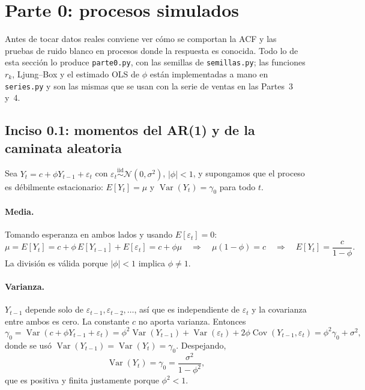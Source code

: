 \section{Parte 0: procesos simulados}
\label{sec:parte0}

Antes de tocar datos reales conviene ver cómo se comportan la ACF y las
pruebas de ruido blanco en procesos donde la respuesta es conocida. Todo lo de
esta sección lo produce \texttt{parte0.py}, con las semillas de
\texttt{semillas.py}; las funciones $r_k$, Ljung--Box y el estimado OLS de
$\phi$ están implementadas a mano en \texttt{series.py} y son las mismas que se
usan con la serie de ventas en las Partes~3 y~4.

\subsection{Inciso 0.1: momentos del AR(1) y de la caminata aleatoria}

Sea $Y_t = c + \phi Y_{t-1} + \varepsilon_t$ con $\varepsilon_t
\overset{\text{iid}}{\sim} \mathcal{N}(0,\sigma^2)$, $|\phi|<1$, y supongamos
que el proceso es débilmente estacionario: $E[Y_t]=\mu$ y
$\operatorname{Var}(Y_t)=\gamma_0$ para todo $t$.

\paragraph{Media.} Tomando esperanza en ambos lados y usando
$E[\varepsilon_t]=0$:
\[
  \mu = E[Y_t] = c + \phi\,E[Y_{t-1}] + E[\varepsilon_t] = c + \phi\mu
  \quad\Longrightarrow\quad
  \mu(1-\phi) = c
  \quad\Longrightarrow\quad
  E[Y_t] = \frac{c}{1-\phi}.
\]
La división es válida porque $|\phi|<1$ implica $\phi\neq 1$.

\paragraph{Varianza.} $Y_{t-1}$ depende solo de
$\varepsilon_{t-1},\varepsilon_{t-2},\dots$, así que es independiente de
$\varepsilon_t$ y la covarianza entre ambos es cero. La constante $c$ no
aporta varianza. Entonces
\[
  \gamma_0 = \operatorname{Var}(c + \phi Y_{t-1} + \varepsilon_t)
  = \phi^2 \operatorname{Var}(Y_{t-1}) + \operatorname{Var}(\varepsilon_t)
  + 2\phi\operatorname{Cov}(Y_{t-1},\varepsilon_t)
  = \phi^2\gamma_0 + \sigma^2,
\]
donde se usó $\operatorname{Var}(Y_{t-1})=\operatorname{Var}(Y_t)=\gamma_0$.
Despejando,
\[
  \operatorname{Var}(Y_t) = \gamma_0 = \frac{\sigma^2}{1-\phi^2},
\]
que es positiva y finita justamente porque $\phi^2<1$.

